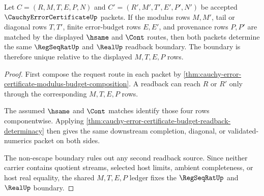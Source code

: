 \begin{theorem}
\label{thm:cauchy-error-certificate-readback-route-uniqueness}
Let $C=(R,M,T,E,P,N)$ and $C'=(R',M',T',E',P',N')$ be accepted $\CauchyErrorCertificateUp$ packets. If the modulus rows $M,M'$, tail or diagonal rows $T,T'$, finite error-budget rows $E,E'$, and provenance rows $P,P'$ are matched by the displayed $\hsame$ and $\Cont$ routes, then both packets determine the same $\RegSeqRatUp$ and $\RealUp$ readback boundary. The boundary is therefore unique relative to the displayed $M,T,E,P$ rows.
\end{theorem}
\begin{proof}
First compose the request route in each packet by \autoref{thm:cauchy-error-certificate-modulus-budget-composition}. A readback can reach $R$ or $R'$ only through the corresponding $M,T,E,P$ rows.

The assumed $\hsame$ and $\Cont$ matches identify those four rows componentwise. Applying \autoref{thm:cauchy-error-certificate-budget-readback-determinacy} then gives the same downstream completion, diagonal, or validated-numerics packet on both sides.

The non-escape boundary rules out any second readback source. Since neither carrier contains quotient streams, selected host limits, ambient completeness, or host real equality, the shared $M,T,E,P$ ledger fixes the $\RegSeqRatUp$ and $\RealUp$ boundary.
\end{proof}

